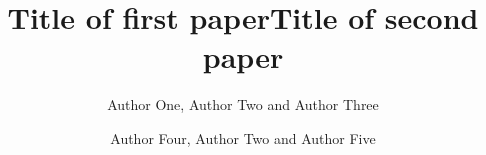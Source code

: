 \documentclass[a4paper]{llncs_MOD}
\begin{document}
\tableofcontents

\mainmatter

\setcounter{page}{1}


\title{\noindent Title of first paper}   \author{Author One, Author Two and Author Three } \maketitle \newpage \addtocounter{page}{5}

\title{\noindent Title of second paper}   \author{Author Four, Author Two and Author Five } \maketitle \newpage \addtocounter{page}{4}


\newpage
\addtocounter{page}{0}


\printindex
\end{document}
